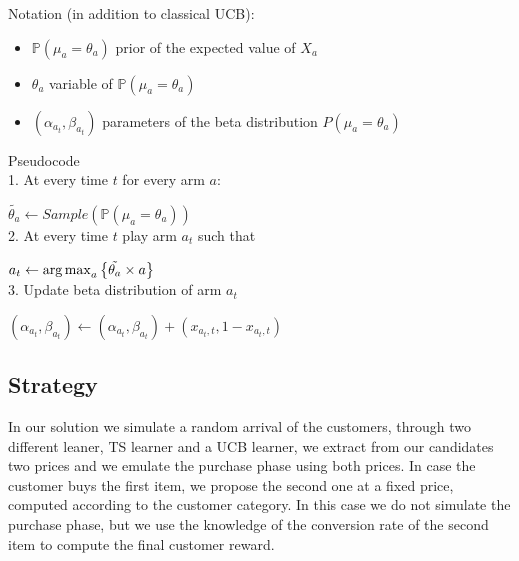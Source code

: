 Notation (in addition to classical UCB):\\
\begin{itemize}
	\item $\mathbb P(\mu_{a}=\theta_{a})$ prior of the expected value of $X_{a}$
	\item $\theta_{a}$ variable of $\mathbb P(\mu_{a}=\theta_{a})$
	\item $(\alpha_{a_{t}}, \beta_{a_{t}})$ parameters of the beta distribution $P(\mu_{a}=\theta_{a})$
\end{itemize}

Pseudocode\\

1. At every time $t$ for every arm $a$:

\hspace{2em}$\tilde{\theta_{a}} \leftarrow Sample(\mathbb P(\mu_{a}=\theta_{a}))$ \\

2. At every time $t$ play arm $a_{t}$ such that 

\hspace{2em}$a_{t} \leftarrow \operatorname{arg\,max}_a \left\{ \tilde{\theta_{a}} \times a \right\} $ \\

3.  Update beta distribution of arm $a_{t}$

\hspace{2em}$(\alpha_{a_{t}}, \beta_{a_{t}}) \leftarrow (\alpha_{a_{t}}, \beta_{a_{t}}) + (x_{a_{t},t}, 1 - x_{a_{t},t})$


\subsection*{Strategy}

In our solution we simulate a random arrival of the customers, through two different leaner, TS learner and a UCB learner, we extract from our candidates two prices and we emulate the purchase phase using both prices. In case the customer buys the first item, we propose the second one at a fixed price, computed according to the customer category. In this case we do not simulate the purchase phase, but we use the knowledge of the conversion rate of the second item to compute the final customer reward. 

